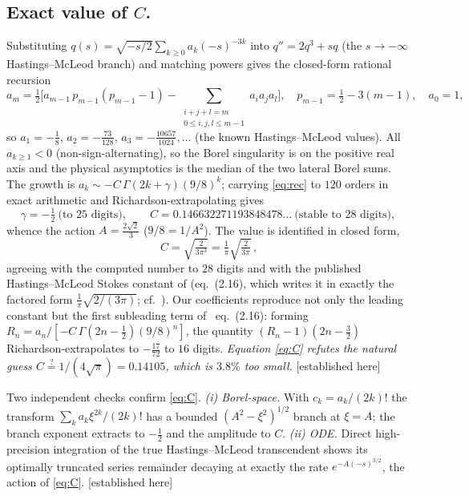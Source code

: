 \documentclass[11pt,reqno]{amsart}
\theoremstyle{plain}
\theoremstyle{definition}
\theoremstyle{remark}
\newcommand{\tagPr}{{\footnotesize\textsf{[established here]}}}
\begin{document}
\subsection{Exact value of $C$.}\label{ssec:C}
Substituting $q(s)=\sqrt{-s/2}\sum_{k\ge0}a_k(-s)^{-3k}$ into $q''=2q^3+sq$ (the $s\to-\infty$
Hastings--McLeod branch) and matching powers gives the closed-form rational recursion
\begin{equation}\label{eq:rec}
a_m=\tfrac12\Big[a_{m-1}\,p_{m-1}(p_{m-1}-1)-\!\!\!\sum_{\substack{i+j+l=m\\ 0\le i,j,l\le m-1}}\!\!\! a_i a_j a_l\Big],
\quad p_{m-1}=\tfrac12-3(m-1),\quad a_0=1,
\end{equation}
so $a_1=-\tfrac18$, $a_2=-\tfrac{73}{128}$, $a_3=-\tfrac{10657}{1024},\dots$ (the known
Hastings--McLeod values). All $a_{k\ge1}<0$ (non-sign-alternating), so the Borel singularity is on
the positive real axis and the physical asymptotics is the median of the two lateral Borel sums. The
growth is $a_k\sim -C\,\Gamma(2k+\gamma)(9/8)^k$; carrying \eqref{eq:rec} to $120$ orders in exact
arithmetic and Richardson-extrapolating gives
\[
\gamma=-\tfrac12\ \text{(to $25$ digits)},\qquad
C=0.146632271193848478\ldots\ \text{(stable to $28$ digits)},
\]
whence the action $A=\tfrac{2\sqrt2}{3}$ ($9/8=1/A^2$). The value is identified in closed form,
\begin{equation}\label{eq:C}
\boxed{\,C=\sqrt{\tfrac{2}{3\pi^3}}=\tfrac1\pi\sqrt{\tfrac{2}{3\pi}}\,,}
\end{equation}
agreeing with the computed number to $28$ digits and with the published Hastings--McLeod Stokes
constant of \cite{Dunne2025} (eq.~(2.16), which writes it in exactly the factored form
$\tfrac1\pi\sqrt{2/(3\pi)}$; cf.\ \cite{KapaevHM,BothnerRHP}). Our coefficients reproduce not only the
leading constant but the first subleading term of \cite{Dunne2025}~eq.~(2.16): forming
$R_n=a_n/[-C\,\Gamma(2n-\tfrac12)(9/8)^n]$, the quantity $(R_n-1)(2n-\tfrac32)$ Richardson-extrapolates
to $-\tfrac{17}{72}$ to $16$ digits. \emph{Equation \eqref{eq:C} refutes the natural guess
$C\stackrel?=1/(4\sqrt\pi)=0.14105$, which is $3.8\%$ too small.} \tagPr

Two independent checks confirm \eqref{eq:C}. \emph{(i) Borel-space.} With $c_k=a_k/(2k)!$ the
transform $\sum_k a_k\xi^{2k}/(2k)!$ has a bounded $(A^2-\xi^2)^{1/2}$ branch at $\xi=A$; the branch
exponent extracts to $-\tfrac12$ and the amplitude to $C$. \emph{(ii) ODE.} Direct high-precision
integration of the true Hastings--McLeod transcendent shows its optimally truncated series remainder
decaying at exactly the rate $e^{-A(-s)^{3/2}}$, the action of \eqref{eq:C}. \tagPr
\end{document}
